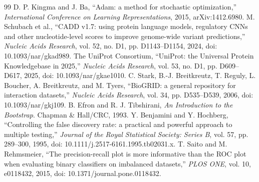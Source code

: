 \documentclass[conference]{IEEEtran}
\begin{document}
\begin{thebibliography}{99}
 D. P. Kingma and J. Ba, ``Adam: a method for stochastic optimization,'' \emph{International Conference on Learning Representations}, 2015, arXiv:1412.6980.
 M. Schubach et al., ``CADD v1.7: using protein language models, regulatory CNNs and other nucleotide-level scores to improve genome-wide variant predictions,'' \emph{Nucleic Acids Research}, vol. 52, no. D1, pp. D1143--D1154, 2024, doi: 10.1093/nar/gkad989.
 The UniProt Consortium, ``UniProt: the Universal Protein Knowledgebase in 2025,'' \emph{Nucleic Acids Research}, vol. 53, no. D1, pp. D609--D617, 2025, doi: 10.1093/nar/gkae1010.
 C. Stark, B.-J. Breitkreutz, T. Reguly, L. Boucher, A. Breitkreutz, and M. Tyers, ``BioGRID: a general repository for interaction datasets,'' \emph{Nucleic Acids Research}, vol. 34, pp. D535--D539, 2006, doi: 10.1093/nar/gkj109.
 B. Efron and R. J. Tibshirani, \emph{An Introduction to the Bootstrap}. Chapman \& Hall/CRC, 1993.
 Y. Benjamini and Y. Hochberg, ``Controlling the false discovery rate: a practical and powerful approach to multiple testing,'' \emph{Journal of the Royal Statistical Society: Series B}, vol. 57, pp. 289--300, 1995, doi: 10.1111/j.2517-6161.1995.tb02031.x.
 T. Saito and M. Rehmsmeier, ``The precision-recall plot is more informative than the ROC plot when evaluating binary classifiers on imbalanced datasets,'' \emph{PLOS ONE}, vol. 10, e0118432, 2015, doi: 10.1371/journal.pone.0118432.
\end{thebibliography}
\end{document}
